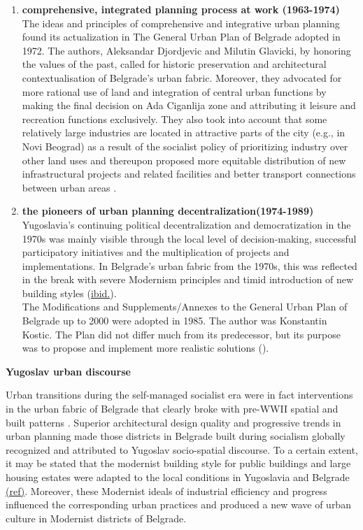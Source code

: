 \documentclass[11pt]{report}
\begin{document}
\begin{enumerate}
\item \textbf{comprehensive, integrated planning process at work (1963-1974)}
\\
The ideas and principles of comprehensive and integrative urban planning found its actualization in The  General  Urban  Plan  of  Belgrade  adopted in 1972.
The authors, Aleksandar Djordjevic and Milutin Glavicki, by honoring the values of the past, called for historic preservation and architectural contextualisation of Belgrade's urban fabric.
Moreover, they advocated for more  rational  use  of  land  and integration of central urban functions by making the final decision on Ada Ciganlija zone and attributing it leisure and recreation functions exclusively. They also took into account that some relatively large industries are located in attractive parts of the city (e.g., in Novi Beograd) as a result of the socialist policy of prioritizing industry over other land uses and thereupon proposed more equitable distribution of new infrastructural projects and related  facilities and better  transport connections between urban areas \href{ref}{\citealt{hirt_belgrade_2009}}.

\item \textbf{the pioneers of urban planning decentralization(1974-1989)}
\\
Yugoslavia’s continuing political decentralization and democratization in the 1970s was mainly visible through the local level of decision-making, successful participatory initiatives and the multiplication of projects and implementations. In Belgrade’s urban fabric from the 1970s, this was reflected in the break with severe Modernism principles and timid introduction of new building styles (\href{ref}{ibid.}).
\\
The Modifications  and  Supplements/Annexes  to  the  General  Urban  Plan  of  Belgrade  up  to 2000 were adopted in 1985. The author was Konstantin Kostic.
The Plan did not differ much from its predecessor, but its purpose was to propose and implement more realistic solutions (\href{ref}{\citealt{grozdanic_belgrade_2008}}).
\end{enumerate}
 
\textbf{Yugoslav urban discourse}

Urban transitions during the self-managed socialist era were in fact interventions in the urban fabric of Belgrade that clearly broke with pre-WWII spatial and built patterns \href{ref}{\citealt{hirt_belgrade_2009}}. Superior architectural design quality and progressive trends in urban planning made those districts in Belgrade built during socialism globally recognized and attributed to Yugoslav socio-spatial discourse. To a certain extent, it may be stated that the modernist building style for  public  buildings  and  large  housing  estates were adapted to the local conditions in Yugoslavia and Belgrade \href{ref}{(ref)}.
Moreover, these Modernist ideals of industrial efficiency and progress influenced the corresponding urban practices and produced a new wave of urban culture in Modernist districts of Belgrade.
\\
\end{document}
